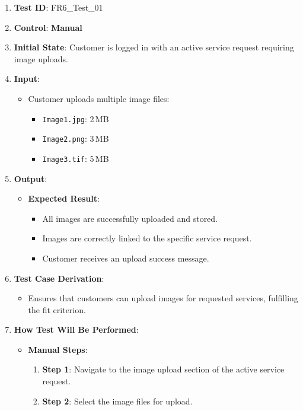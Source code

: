 \documentclass[12pt, titlepage]{article}
\begin{document}
\begin{enumerate}
    \item \textbf{Test ID}: FR6\_Test\_01
    \item \textbf{Control}: \textbf{Manual}
    \item \textbf{Initial State}: Customer is logged in with an active service request requiring image uploads.
    \item \textbf{Input}:
    \begin{itemize}
        \item Customer uploads multiple image files:
        \begin{itemize}
            \item \texttt{Image1.jpg}: 2\,MB
            \item \texttt{Image2.png}: 3\,MB
            \item \texttt{Image3.tif}: 5\,MB
        \end{itemize}
    \end{itemize}
    \item \textbf{Output}:
    \begin{itemize}
        \item \textbf{Expected Result}:
        \begin{itemize}
            \item All images are successfully uploaded and stored.
            \item Images are correctly linked to the specific service request.
            \item Customer receives an upload success message.
        \end{itemize}
    \end{itemize}
    \item \textbf{Test Case Derivation}:
    \begin{itemize}
        \item Ensures that customers can upload images for requested services, fulfilling the fit criterion.
    \end{itemize}
    \item \textbf{How Test Will Be Performed}:
    \begin{itemize}
        \item \textbf{Manual Steps}:
        \begin{enumerate}
            \item \textbf{Step 1}: Navigate to the image upload section of the active service request.
            \item \textbf{Step 2}: Select the image files for upload.

\end{enumerate}
\end{itemize}
\end{enumerate}
\end{document}
